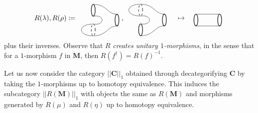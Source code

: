 \documentclass[11pt]{amsart}
\newcommand{\cat}[1]{\mathbf{#1}}
\theoremstyle{remark}
\theoremstyle{definition}
\begin{document}
%
%
%
\[
%
%
R(\lambda) , R(\rho) \coloneqq
\raisebox{-0.5\height}{%
\begin{tikzpicture}
\begin{scope}[shift={(1.2,-0.5)}]
\draw [thick]  (1.6,-0.2) ellipse (0.1 and 0.3);
\draw [thick]  (0.4,0.3) ellipse (0.1 and 0.3);
\draw [dashed] (0.4,-0.7) ellipse (0.1 and 0.3);
\draw (0.4,0) .. controls (1,0.1) and (1,-0.5) .. (0.4,-0.4);
\draw (0.4,0.6) .. controls (1.1,0.6) and (1.1,0.1) .. (1.6,0.1);
\draw (0.4,-1) .. controls (1.1,-1) and (1.1,-0.5) .. (1.6,-0.5);
\end{scope}
\begin{scope}[shift={(1.6,-1.2)}]
\draw [dashed]  (0,0) ellipse (0.1 and 0.3);
\draw (0,0.3) .. controls (-0.8,0.3) and (-0.8,-0.3) .. (0,-0.3);
\end{scope}
\end{tikzpicture}
}
%
%
%
,
%
%
\raisebox{-0.5\height}{%
\begin{tikzpicture}
\begin{scope}[shift={(1.2,-0.5)}]
\draw [thick]  (1.6,-0.2) ellipse (0.1 and 0.3);
\draw [dashed]  (0.4,0.3) ellipse (0.1 and 0.3);
\draw [thick] (0.4,-0.7) ellipse (0.1 and 0.3);
\draw (0.4,0) .. controls (1,0.1) and (1,-0.5) .. (0.4,-0.4);
\draw (0.4,0.6) .. controls (1.1,0.6) and (1.1,0.1) .. (1.6,0.1);
\draw (0.4,-1) .. controls (1.1,-1) and (1.1,-0.5) .. (1.6,-0.5);
\end{scope}
\begin{scope}[shift={(1.6,-0.2)}]
\draw [dashed]  (0,0) ellipse (0.1 and 0.3);
\draw (0,0.3) .. controls (-0.8,0.3) and (-0.8,-0.3) .. (0,-0.3);
\end{scope}
\end{tikzpicture}
}
%
%
%
\quad \mapsto \quad
%
%
\raisebox{-0.5\height}{%
\begin{tikzpicture}
\draw [thick]  (1.6,-0.2) ellipse (0.1 and 0.3);
\draw [thick] (0.4,-0.2) ellipse (0.1 and 0.3);
\draw (0.4,0.1) -- (1.6,0.1);
\draw (0.4,-0.5) -- (1.6,-0.5);
\end{tikzpicture}
}
\]
plus their inverses. Observe that $R$ \emph{creates unitary $1$-morphisms}, in the sense that for a $1$-morphism $f$ in $\cat{M}$, then $R(f^{\dagger}) = R(f)^{-1}$. 

Let us now consider the category $|| \cat{C} ||_1$ obtained through decategorifying $\cat{C}$ by taking the $1$-morphisms up to homotopy equivalence.  This induces the subcategory $|| R(\cat{M}) ||_1$ with objects the same as $R (\cat{M})$ and morphisms generated by $R(\mu)$ and $R(\eta)$ up to homotopy equivalence.
\end{document}
